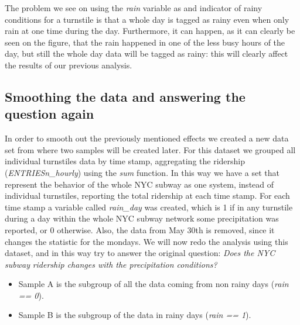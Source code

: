 \documentclass[letterpaper,10pt,english]{sphinxmanual}
\begin{document}
The problem we see on using the \emph{rain} variable as and indicator of rainy conditions
for a turnstile is that a whole day is tagged as rainy even when only rain at one
time during the day. Furthermore, it can happen, as it can clearly be seen on the figure,
that the rain happened in one of the less busy hours of the day, but still the whole
day data will be tagged as rainy: this will clearly affect the results of our
previous analysis.


\subsection{Smoothing the data and answering the question again}
\label{section1:smoothing-the-data-and-answering-the-question-again}
In order to smooth out the previously mentioned effects we created a new data
set from where two samples will be created later. For this dataset we grouped
all individual turnstiles data by time stamp, aggregating the ridership
(\emph{ENTRIESn\_hourly}) using the \emph{sum} function. In this way we have a set that
represent the behavior of the whole NYC subway as one system, instead of
individual turnstiles, reporting the total ridership at each time stamp. For each
time stamp a variable called \emph{rain\_day} was created, which is 1 if in any
turnstile during a day within the whole NYC subway network some precipitation
was reported, or 0 otherwise. Also, the data from May 30th is removed, since it
changes the statistic for the mondays. We will now redo the analysis using this
dataset, and in this way try to answer the original question: \emph{Does the NYC subway}
\emph{ridership changes with the precipitation conditions?}
\begin{itemize}
\item {} 
Sample A is the subgroup of all the data coming from non rainy days (\emph{rain == 0}).

\item {} 
Sample B is the subgroup of the data in rainy days (\emph{rain == 1}).

\end{itemize}
\end{document}
